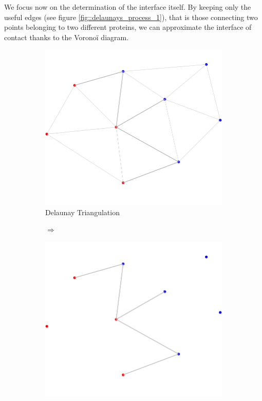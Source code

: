 We focus now on the determination of the interface itself.
By keeping only the useful edges (see figure \ref{fig::delaunays_process_1}),
 that is those connecting two points belonging to two different proteins,
 we can approximate the interface of contact thanks to the Voronoï diagram.

\begin{figure}[ht]
\centering
\begin{subfigure}{0.45\textwidth}
  \centering
  \includegraphics[width=\textwidth]{figures/process_d_1.png}
  \caption{Delaunay Triangulation}
  \label{fig::process_d_1}
\end{subfigure}%
\begin{subfigure}{0.1\textwidth}
  \centering
  $\Longrightarrow$
\end{subfigure}%
\begin{subfigure}{0.45\textwidth}
  \centering
  \includegraphics[width=\textwidth]{figures/process_d_2.png}

\end{subfigure}
\end{figure}
